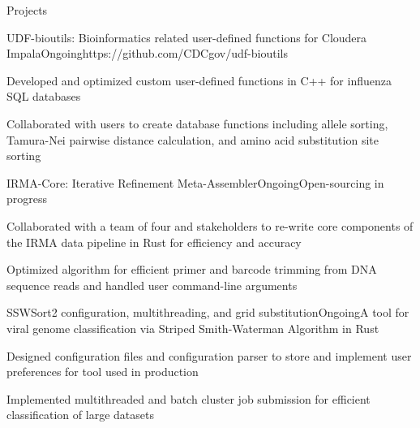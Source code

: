 \documentclass{resume} %
\begin{document}
\begin{rSection}{Projects}
\itemsep -2pt


  \begin{rSubsection}{UDF-bioutils: Bioinformatics related user-defined functions for Cloudera Impala}{Ongoing}{https://github.com/CDCgov/udf-bioutils}{}
  \item Developed and optimized custom user-defined functions in C++ for influenza SQL databases
  \item Collaborated with users to create database functions including allele sorting, Tamura-Nei pairwise distance calculation, and amino acid substitution site sorting
  \end{rSubsection}

  \begin{rSubsection}{IRMA-Core: Iterative Refinement Meta-Assembler}{Ongoing}{Open-sourcing in progress}{}
  \item Collaborated with a team of four and stakeholders to re-write core components of the IRMA data pipeline in Rust for efficiency and accuracy
  \item Optimized algorithm for efficient primer and barcode trimming from DNA sequence reads and handled user command-line arguments
  \end{rSubsection}

  \pagebreak

  \begin{rSubsection}{SSWSort2 configuration, multithreading, and grid substitution}{Ongoing}{A tool for viral genome classification via Striped Smith-Waterman Algorithm in Rust}{}
  \item Designed configuration files and configuration parser to store and implement user preferences for tool used in production
  \item Implemented multithreaded and batch cluster job submission for efficient classification of large datasets
  \end{rSubsection}


\end{rSection}
\end{document}
